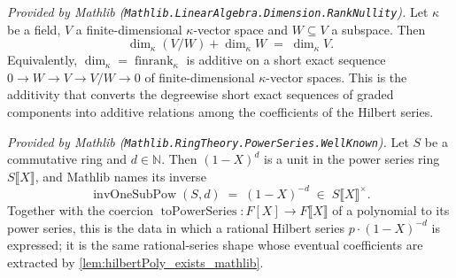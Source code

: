 \begin{lemma}
  \label{lem:finrank_ses_additive_mathlib}
  \mathlibok
  \textit{Provided by Mathlib
  (\texttt{Mathlib.LinearAlgebra.Dimension.RankNullity}).}
  Let \(\kappa\) be a field, \(V\) a finite-dimensional \(\kappa\)-vector space and
  \(W \subseteq V\) a subspace. Then
  \[
    \dim_\kappa (V / W) + \dim_\kappa W \;=\; \dim_\kappa V .
  \]
  Equivalently, \(\dim_\kappa = \operatorname{finrank}_\kappa\) is additive on a
  short exact sequence \(0 \to W \to V \to V/W \to 0\) of finite-dimensional
  \(\kappa\)-vector spaces. This is the additivity that converts the degreewise
  short exact sequences of graded components into additive relations among the
  coefficients of the Hilbert series.
\end{lemma}

\begin{lemma}
  \label{lem:invOneSubPow_mathlib}
  \mathlibok
  \textit{Provided by Mathlib
  (\texttt{Mathlib.RingTheory.PowerSeries.WellKnown}).}
  Let \(S\) be a commutative ring and \(d \in \mathbb{N}\). Then \((1 - X)^d\) is a
  unit in the power series ring \(S\llbracket X\rrbracket\), and Mathlib names its
  inverse
  \[
    \operatorname{invOneSubPow}(S, d) \;=\; (1 - X)^{-d}
      \;\in\; S\llbracket X\rrbracket^{\times}.
  \]
  Together with the coercion
  \(\operatorname{toPowerSeries} : F[X] \to F\llbracket X\rrbracket\) of a
  polynomial to its power series, this is the data in which a rational Hilbert
  series \(p \cdot (1 - X)^{-d}\) is expressed; it is the same rational-series shape
  whose eventual coefficients are extracted by
  \cref{lem:hilbertPoly_exists_mathlib}.
\end{lemma}

